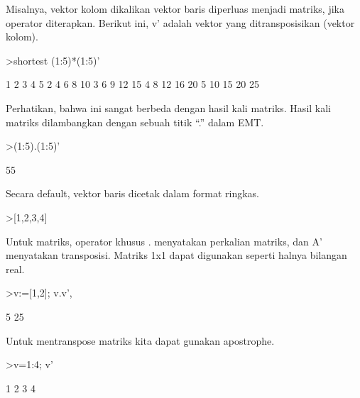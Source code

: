 \documentclass{article}
\begin{document}
\begin{eulernotebook}
\begin{eulercomment}
Misalnya, vektor kolom dikalikan vektor baris diperluas menjadi
matriks, jika operator diterapkan. Berikut ini, v' adalah vektor yang
ditransposisikan (vektor kolom).
\end{eulercomment}
\begin{eulerprompt}
>shortest (1:5)*(1:5)'
\end{eulerprompt}
\begin{euleroutput}
       1      2      3      4      5 
       2      4      6      8     10 
       3      6      9     12     15 
       4      8     12     16     20 
       5     10     15     20     25 
\end{euleroutput}
\begin{eulercomment}
Perhatikan, bahwa ini sangat berbeda dengan hasil kali matriks. Hasil
kali matriks dilambangkan dengan sebuah titik “.” dalam EMT.
\end{eulercomment}
\begin{eulerprompt}
>(1:5).(1:5)'
\end{eulerprompt}
\begin{euleroutput}
  55
\end{euleroutput}
\begin{eulercomment}
Secara default, vektor baris dicetak dalam format ringkas.
\end{eulercomment}
\begin{eulerprompt}
>[1,2,3,4]
\end{eulerprompt}
\begin{euleroutput}
  [1,  2,  3,  4]
\end{euleroutput}
\begin{eulercomment}
Untuk matriks, operator khusus . menyatakan perkalian matriks, dan A'
menyatakan transposisi. Matriks 1x1 dapat digunakan seperti halnya
bilangan real.
\end{eulercomment}
\begin{eulerprompt}
>v:=[1,2]; v.v', %
\end{eulerprompt}
\begin{euleroutput}
  5
  25
\end{euleroutput}
\begin{eulercomment}
Untuk mentranspose matriks kita dapat gunakan apostrophe.
\end{eulercomment}
\begin{eulerprompt}
>v=1:4; v'
\end{eulerprompt}
\begin{euleroutput}
              1 
              2 
              3 
              4 
\end{euleroutput}

\end{eulernotebook}
\end{document}
